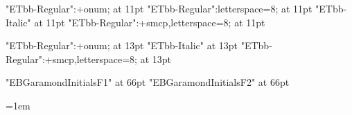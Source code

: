 



\font\elevenrm "ETbb-Regular":+onum; at 11pt\relax
\font\elevenrmspaced "ETbb-Regular":letterspace=8; at 11pt\relax
\font\elevenit "ETbb-Italic" at 11pt\relax
\font\elevensc "ETbb-Regular":+smcp,letterspace=8; at 11pt\relax

\font\fourteenrm "ETbb-Regular":+onum; at 13pt\relax
\font\fourteenit "ETbb-Italic" at 13pt\relax
\font\fourteensc "ETbb-Regular":+smcp,letterspace=8; at 13pt\relax

\font\ebginitbg "EBGaramondInitialsF1" at 66pt
\font\ebginitfg "EBGaramondInitialsF2" at 66pt


\def\normalsize{%
	\gdef\rm{\elevenrm}%
	\gdef\rmspaced{\elevenrmspaced}%
	\gdef\it{\elevenit}%
	\gdef\sc{\elevensc}%
}

\def\chaptersize{%
	\gdef\rm{\fourteenrm}%
	\gdef\it{\fourteenit}%
	\gdef\sc{\fourteensc}%
}

\def\emph{\it}

\normalsize\rm



\baselineskip=15pt
\frenchspacing

\parskip=0pt
\parindent=1em

\emergencystretch=4pt

\def\firstnoindent{\global\everypar={\wipeeverypar\setbox7=\lastbox}}
\def\wipeeverypar{\global\everypar={}}

{}


\def\beginchapter#1#2{%
	\centerline{\smash{\normalsize\rmspaced\uppercase{#1}}}
	\vskip\baselineskip
	\centerline{\smash{\normalsize\rmspaced
	\spaceskip=5pt
	\uppercase{#2}}}
	\vskip3\baselineskip
	\firstnoindent
}

\def\endchapter{%
	\vfil\break
}

\def\sectionbreak{%
	\vskip\baselineskip	
	\line{\hfill *\quad *\quad *\hfill}
	\vskip\baselineskip
}


